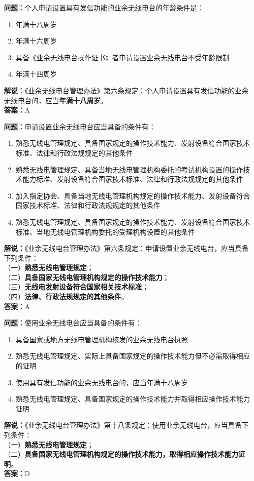 \noindent\textbf{问题：}个人申请设置具有发信功能的业余无线电台的年龄条件是：
\begin{enumerate}[label=\Alph*), leftmargin=3em]
\item 年满十八周岁
\item 年满十六周岁
\item 具备《业余无线电台操作证书》者申请设置业余无线电台不受年龄限制
\item 年满十四周岁
\end{enumerate}
\noindent\textbf{解说：}《业余无线电台管理办法》第六条规定：个人申请设置具有发信功能的业余无线电台的，应当\textbf{年满十八周岁}。\\\noindent\textbf{答案：}A



\bigskip


\noindent\textbf{问题：}申请设置业余无线电台应当具备的条件有：
\begin{enumerate}[label=\Alph*), leftmargin=3em]
\item 熟悉无线电管理规定、具备国家规定的操作技术能力、发射设备符合国家技术标准、法律和行政法规规定的其他条件
\item 熟悉无线电管理规定、具备当地无线电管理机构委托的考试机构设置的操作技术能力标准、发射设备符合国家技术标准、法律和行政法规规定的其他条件
\item 加入指定协会、具备当地无线电管理机构规定的操作技术能力、发射设备符合国家技术标准、法律和行政法规规定的其他条件
\item 熟悉无线电管理规定、具备国家规定的操作技术能力、发射设备符合国家技术标准、当地无线电管理机构委托的受理机构设置的其他条件
\end{enumerate}
\noindent\textbf{解说：}《业余无线电台管理办法》第六条规定：申请设置业余无线电台，应当具备下列条件：\\
（一）\textbf{熟悉无线电管理规定}；\\
（二）\textbf{具备国家无线电管理机构规定的操作技术能力}；\\
（三）\textbf{无线电发射设备符合国家相关技术标准}；\\
（四）\textbf{法律、行政法规规定的其他条件}。\\\noindent\textbf{答案：}A


\bigskip


\noindent\textbf{问题：}使用业余无线电台应当具备的条件有：
\begin{enumerate}[label=\Alph*), leftmargin=3em]
\item 具备国家或地方无线电管理机构核发的业余无线电台执照
\item 熟悉无线电管理规定、实际上具备国家规定的操作技术能力但不必需取得相应的证明
\item 使用具有发信功能的业余无线电台的，应当年满十八周岁
\item 熟悉无线电管理规定、具备国家规定的操作技术能力并取得相应操作技术能力证明
\end{enumerate}
\noindent\textbf{解说：}《业余无线电台管理办法》第十八条规定：使用业余无线电台，应当具备下列条件：\\
（一）\textbf{熟悉无线电管理规定}；\\
（二）\textbf{具备国家无线电管理机构规定的操作技术能力，取得相应操作技术能力证明}。\\\noindent\textbf{答案：}D



